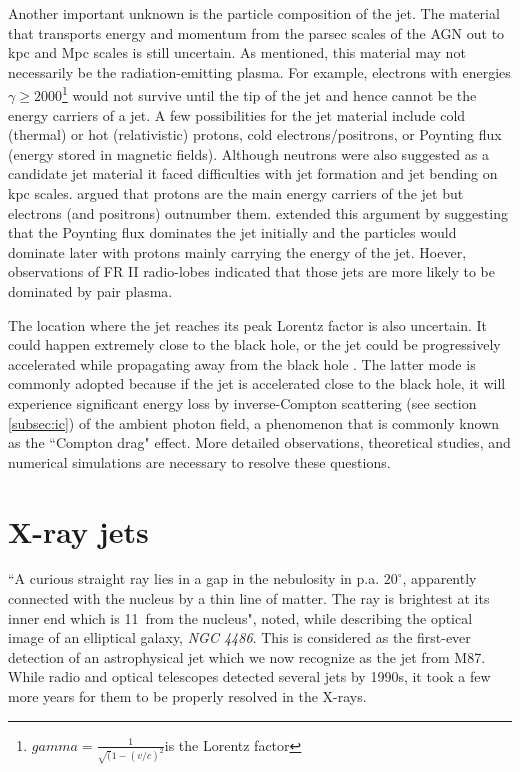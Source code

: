 Another important unknown is the particle composition of the jet. The material that transports energy and momentum from the parsec scales of the AGN out to kpc and Mpc scales is still uncertain. As mentioned, this material may not necessarily be the radiation-emitting plasma. For example, electrons with energies $\gamma\geq2000$\footnote{$gamma=\frac{1}{\sqrt(1-(v/c)^2} $is the Lorentz factor} would not survive until the tip of the jet  \citep{2007RMxAC..27..188H} and hence cannot be the energy carriers of a jet. A few possibilities for the jet material include cold (thermal) or hot (relativistic) protons, cold electrons/positrons, or Poynting flux (energy stored in magnetic fields).  Although neutrons were also suggested as a candidate jet material \citep{dermer2004nonthermal} it faced difficulties with jet formation and jet bending on kpc scales. \citet{sikora2000pair} argued that protons are the main energy carriers of the jet but electrons (and positrons) outnumber them. \citep{sikora2005quasar} extended this argument by suggesting that the Poynting flux dominates the jet initially and the particles would dominate later with protons mainly carrying the energy of the jet. Hoever, observations of FR II radio-lobes indicated that those jets are more likely to be dominated by pair plasma.

The location where the jet reaches its peak Lorentz factor is also uncertain. It could happen extremely close to the black hole, or the jet could be progressively accelerated while propagating away from the black hole  \citep[see~][]{meier2003theory}. The latter mode is commonly adopted because if the jet is accelerated close to the black hole, it will experience significant energy loss by inverse-Compton scattering (see section \ref{subsec:ic}) of the ambient photon field, a phenomenon that is commonly known as the ``Compton drag" effect.
More detailed observations, theoretical studies, and numerical simulations are necessary to resolve these questions.

\section{X-ray jets\label{sec:xray_jets}}
``A curious straight ray lies in a gap in the nebulosity in p.a. $20^\circ$, apparently connected with the nucleus by a thin line of matter. The ray is brightest at its inner end which is 11\as~from the nucleus", \citet{curtis1918descriptions} noted, while describing the optical image of an elliptical galaxy, \textit{NGC 4486}. This is considered as the first-ever detection of an astrophysical jet which we now recognize as the jet from M87. While radio and optical telescopes detected several jets by 1990s, it took a few more years for them to be properly resolved in the X-rays.

